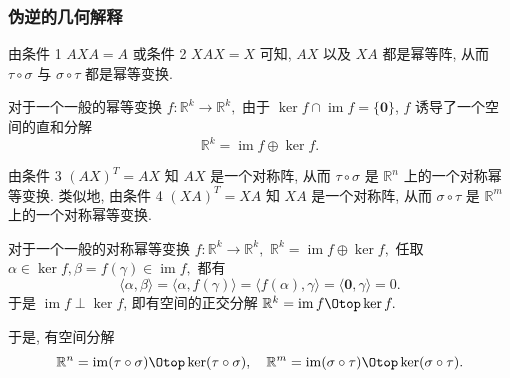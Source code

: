 
\begin{frame}
\frametitle{伪逆的几何解释}

{\color{red}} 由条件 1 $AXA = A$ 或条件 2 $XAX = X$ 可知, $AX$ 以及 $XA$ 都是幂等阵, 从而 $\tau\circ\sigma$ 与 $\sigma\circ\tau$ 都是幂等变换.

\pause
\vspace{0.5em}
对于一个一般的幂等变换 $f: \mathbb{R}^k \to \mathbb{R}^k,$ 由于 $\ker f \cap \operatorname{im} f = \{\mathbf{0}\}$, $f$ 诱导了一个空间的直和分解
\[
\mathbb{R}^k = \operatorname{im} f \oplus \ker f.
\]

\pause
\vspace{1em}

{\color{red}} 由条件 3 $(AX)^T = AX$ 知 $AX$ 是一个对称阵, 从而 $\tau\circ\sigma$ 是 $\mathbb{R}^n$ 上的一个对称幂等变换.
\pause
类似地, 由条件 4 $(XA)^T = XA$ 知 $XA$ 是一个对称阵, 从而 $\sigma\circ\tau$ 是 $\mathbb{R}^m$ 上的一个对称幂等变换.

\pause
\vspace{0.5em}

对于一个一般的对称幂等变换 $f: \mathbb{R}^k \to \mathbb{R}^k,$ $\mathbb{R}^k = \operatorname{im} f \oplus \ker f,$ 任取 $\alpha \in \ker f, \beta = f(\gamma) \in \operatorname{im} f,$ 都有
\[
\langle \alpha, \beta \rangle = \langle \alpha, f(\gamma) \rangle = \langle f(\alpha), \gamma \rangle = \langle \mathbf{0}, \gamma \rangle = 0.
\]
于是 $\operatorname{im} f \perp \ker f$, 即有空间的正交分解 $\mathbb{R}^k = \operatorname{im} f \Otop \ker f.$

\pause
\vspace{0.5em}

于是, 有空间分解
\[
\mathbb{R}^n = \operatorname{im}(\tau\circ\sigma) \Otop \ker(\tau\circ\sigma), \quad \mathbb{R}^m = \operatorname{im}(\sigma\circ\tau) \Otop \ker(\sigma\circ\tau).
\]

\end{frame}


